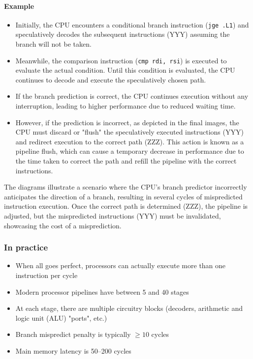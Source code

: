 \documentclass[12pt]{article}
\begin{document}
\paragraph{Example}
\begin{itemize}
    \item Initially, the CPU encounters a conditional branch instruction (\texttt{jge .L1}) and speculatively decodes the subsequent instructions (YYY) assuming the branch will not be taken.
    \item Meanwhile, the comparison instruction (\texttt{cmp rdi, rsi}) is executed to evaluate the actual condition. Until this condition is evaluated, the CPU continues to decode and execute the speculatively chosen path.
    \item If the branch prediction is correct, the CPU continues execution without any interruption, leading to higher performance due to reduced waiting time.
    \item However, if the prediction is incorrect, as depicted in the final images, the CPU must discard or "flush" the speculatively executed instructions (YYY) and redirect execution to the correct path (ZZZ). This action is known as a pipeline flush, which can cause a temporary decrease in performance due to the time taken to correct the path and refill the pipeline with the correct instructions.
\end{itemize}

The diagrams illustrate a scenario where the CPU's branch predictor incorrectly anticipates the direction of a branch, resulting in several cycles of mispredicted instruction execution. Once the correct path is determined (ZZZ), the pipeline is adjusted, but the mispredicted instructions (YYY) must be invalidated, showcasing the cost of a misprediction.

\subsubsection{In practice}
\begin{itemize}
    \item When all goes perfect, processors can actually execute more than one instruction per cycle
    \item Modern processor pipelines have between 5 and 40 stages
    \item At each stage, there are multiple circuitry blocks (decoders, arithmetic and logic unit (ALU) "ports", etc.)
    \item Branch mispredict penalty is typically $\geq 10$ cycles
    \item Main memory latency is 50--200 cycles
\end{itemize}
\end{document}
